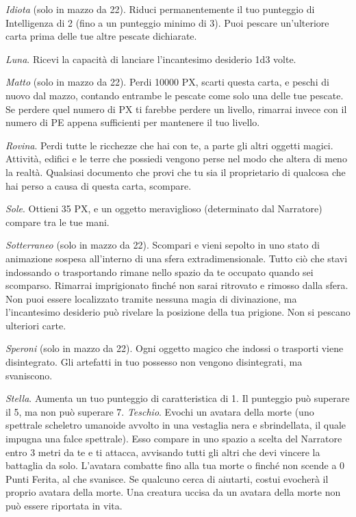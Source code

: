 \begin{multicols}{2}
\textit{Idiota} (solo in mazzo da 22). Riduci permanentemente il tuo punteggio di Intelligenza di 2 (fino a un punteggio minimo di 3). Puoi pescare un'ulteriore carta prima delle tue altre pescate dichiarate.

\textit{Luna}. Ricevi la capacità di lanciare l'incantesimo desiderio 1d3 volte.

\textit{Matto} (solo in mazzo da 22). Perdi 10000 PX, scarti questa carta, e peschi di nuovo dal mazzo, contando entrambe le pescate come solo una delle tue pescate. Se perdere quel numero di PX ti farebbe perdere un livello, rimarrai invece con il numero di PE appena sufficienti per mantenere il tuo livello.

\textit{Rovina}. Perdi tutte le ricchezze che hai con te, a parte gli altri oggetti magici. Attività, edifici e le terre che possiedi vengono perse nel modo che altera di meno la realtà. Qualsiasi documento che provi che tu sia il proprietario di qualcosa che hai perso a causa di questa carta, scompare.

\textit{Sole}. Ottieni 35 PX, e un oggetto meraviglioso (determinato dal Narratore) compare tra le tue mani.

\textit{Sotterraneo} (solo in mazzo da 22). Scompari e vieni sepolto in uno stato di animazione sospesa all'interno di una sfera extradimensionale. Tutto ciò che stavi indossando o trasportando rimane nello spazio da te occupato quando sei scomparso. Rimarrai imprigionato finché non sarai ritrovato e rimosso dalla sfera. Non puoi essere localizzato tramite nessuna magia di divinazione, ma l'incantesimo desiderio può rivelare la posizione della tua prigione. Non si pescano ulteriori carte.

\textit{Speroni} (solo in mazzo da 22). Ogni oggetto magico che indossi o trasporti viene disintegrato. Gli artefatti in tuo possesso non vengono disintegrati, ma svaniscono.

\textit{Stella}. Aumenta un tuo punteggio di caratteristica di 1. Il punteggio può superare il 5, ma non può superare 7.
\textit{Teschio}. Evochi un avatara della morte (uno spettrale scheletro umanoide avvolto in una vestaglia nera e sbrindellata, il quale impugna una falce spettrale). Esso compare in uno spazio a scelta del Narratore entro 3 metri da te e ti attacca, avvisando tutti gli altri che devi vincere la battaglia da solo. L'avatara combatte fino alla tua morte o finché non scende a 0 Punti Ferita, al che svanisce. Se qualcuno cerca di aiutarti, costui evocherà il proprio avatara della morte. Una creatura uccisa da un avatara della morte non può essere riportata in vita.


\end{multicols}
